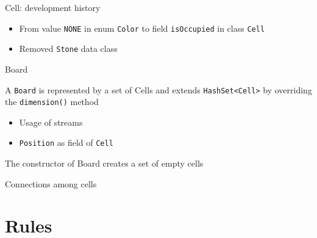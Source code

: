 \documentclass{beamer}
\begin{document}
\begin{frame}{Cell: development history}
\begin{itemize}
\item From value \texttt{NONE} in enum \texttt{Color} to field \texttt{isOccupied} in class \texttt{Cell}
\item Removed \texttt{Stone} data class
\end{itemize}


\end{frame}


\begin{frame}{Board}

A \texttt{Board} is represented by a set of Cells and extends \texttt{HashSet<Cell>} by overriding the \texttt{dimension()} method
\begin{itemize}
    \item Usage of streams
    \item \texttt{Position} as field of \texttt{Cell}    
\end{itemize}




The constructor of Board creates a set of empty cells

\end{frame}


\begin{frame}{Connections among cells}


\end{frame}

\section{Rules}
\end{document}
